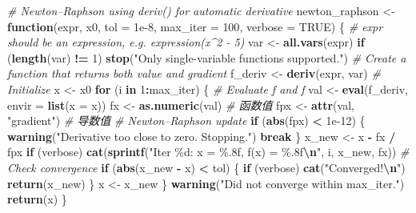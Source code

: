 \documentclass[
]{book}
\newenvironment{Shaded}{\begin{snugshade}}{\end{snugshade}}
\newcommand{\AttributeTok}[1]{\textcolor[rgb]{0.13,0.29,0.53}{#1}}
\newcommand{\CommentTok}[1]{\textcolor[rgb]{0.56,0.35,0.01}{\textit{#1}}}
\newcommand{\ConstantTok}[1]{\textcolor[rgb]{0.56,0.35,0.01}{#1}}
\newcommand{\ControlFlowTok}[1]{\textcolor[rgb]{0.13,0.29,0.53}{\textbf{#1}}}
\newcommand{\DecValTok}[1]{\textcolor[rgb]{0.00,0.00,0.81}{#1}}
\newcommand{\FloatTok}[1]{\textcolor[rgb]{0.00,0.00,0.81}{#1}}
\newcommand{\FunctionTok}[1]{\textcolor[rgb]{0.13,0.29,0.53}{\textbf{#1}}}
\newcommand{\NormalTok}[1]{#1}
\newcommand{\OtherTok}[1]{\textcolor[rgb]{0.56,0.35,0.01}{#1}}
\newcommand{\SpecialCharTok}[1]{\textcolor[rgb]{0.81,0.36,0.00}{\textbf{#1}}}
\newcommand{\StringTok}[1]{\textcolor[rgb]{0.31,0.60,0.02}{#1}}
\begin{document}
\begin{enumerate}
\begin{Shaded}
\begin{Highlighting}[]
\CommentTok{\# Newton–Raphson using deriv() for automatic derivative}
\NormalTok{newton\_raphson }\OtherTok{\textless{}{-}} \ControlFlowTok{function}\NormalTok{(expr, x0, }\AttributeTok{tol =} \FloatTok{1e{-}8}\NormalTok{, }\AttributeTok{max\_iter =} \DecValTok{100}\NormalTok{, }\AttributeTok{verbose =} \ConstantTok{TRUE}\NormalTok{) \{}
  \CommentTok{\# expr should be an expression, e.g. expression(x\^{}2 {-} 5)}
\NormalTok{  var }\OtherTok{\textless{}{-}} \FunctionTok{all.vars}\NormalTok{(expr)}
  \ControlFlowTok{if}\NormalTok{ (}\FunctionTok{length}\NormalTok{(var) }\SpecialCharTok{!=} \DecValTok{1}\NormalTok{) }\FunctionTok{stop}\NormalTok{(}\StringTok{"Only single{-}variable functions supported."}\NormalTok{)}
  \CommentTok{\# Create a function that returns both value and gradient}
\NormalTok{  f\_deriv }\OtherTok{\textless{}{-}} \FunctionTok{deriv}\NormalTok{(expr, var)}
  \CommentTok{\# Initialize}
\NormalTok{  x }\OtherTok{\textless{}{-}}\NormalTok{ x0}
  \ControlFlowTok{for}\NormalTok{ (i }\ControlFlowTok{in} \DecValTok{1}\SpecialCharTok{:}\NormalTok{max\_iter) \{}
    \CommentTok{\# Evaluate f and f\textquotesingle{}}
\NormalTok{    val }\OtherTok{\textless{}{-}} \FunctionTok{eval}\NormalTok{(f\_deriv, }\AttributeTok{envir =} \FunctionTok{list}\NormalTok{(}\AttributeTok{x =}\NormalTok{ x))}
\NormalTok{    fx  }\OtherTok{\textless{}{-}} \FunctionTok{as.numeric}\NormalTok{(val)        }\CommentTok{\# 函数值}
\NormalTok{    fpx }\OtherTok{\textless{}{-}} \FunctionTok{attr}\NormalTok{(val, }\StringTok{"gradient"}\NormalTok{)  }\CommentTok{\# 导数值}
    \CommentTok{\# Newton–Raphson update}
    \ControlFlowTok{if}\NormalTok{ (}\FunctionTok{abs}\NormalTok{(fpx) }\SpecialCharTok{\textless{}} \FloatTok{1e{-}12}\NormalTok{) \{}
      \FunctionTok{warning}\NormalTok{(}\StringTok{"Derivative too close to zero. Stopping."}\NormalTok{)}
      \ControlFlowTok{break}
\NormalTok{    \}}
\NormalTok{    x\_new }\OtherTok{\textless{}{-}}\NormalTok{ x }\SpecialCharTok{{-}}\NormalTok{ fx }\SpecialCharTok{/}\NormalTok{ fpx}
    \ControlFlowTok{if}\NormalTok{ (verbose)}
      \FunctionTok{cat}\NormalTok{(}\FunctionTok{sprintf}\NormalTok{(}\StringTok{"Iter \%d: x = \%.8f, f(x) = \%.8f}\SpecialCharTok{\textbackslash{}n}\StringTok{"}\NormalTok{, i, x\_new, fx))}
    \CommentTok{\# Check convergence}
    \ControlFlowTok{if}\NormalTok{ (}\FunctionTok{abs}\NormalTok{(x\_new }\SpecialCharTok{{-}}\NormalTok{ x) }\SpecialCharTok{\textless{}}\NormalTok{ tol) \{}
      \ControlFlowTok{if}\NormalTok{ (verbose) }\FunctionTok{cat}\NormalTok{(}\StringTok{"Converged!}\SpecialCharTok{\textbackslash{}n}\StringTok{"}\NormalTok{)}
      \FunctionTok{return}\NormalTok{(x\_new)}
\NormalTok{    \}}
\NormalTok{    x }\OtherTok{\textless{}{-}}\NormalTok{ x\_new}
\NormalTok{  \}}
  \FunctionTok{warning}\NormalTok{(}\StringTok{"Did not converge within max\_iter."}\NormalTok{)}
  \FunctionTok{return}\NormalTok{(x)}
\NormalTok{\}}


\end{Highlighting}
\end{Shaded}
\end{enumerate}
\end{document}
